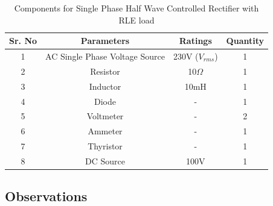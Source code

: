 \begin{table}[h]
    \renewcommand{\arraystretch}{1.3}
    \label{table_components_required_single-phase-half-wave-controlled-rectifier-with-RLE-load}
    \centering
    \begin{tabular}{|c|c|c|c|}
        \hline
        Sr. No & Parameters                     & Ratings            & Quantity \\
        \hline
        \hline
        1      & AC Single Phase Voltage Source & 230V ($ V_{rms} $) & 1        \\
        \hline
        2      & Resistor                       & 10$ \Omega $       & 1        \\
        \hline
        3      & Inductor                       & 10mH               & 1        \\
        \hline
        4      & Diode                          & -                  & 1        \\
        \hline
        5      & Voltmeter                      & -                  & 2        \\
        \hline
        6      & Ammeter                        & -                  & 1        \\
        \hline
        7      & Thyristor                      & -                  & 1        \\
        \hline
        8      & DC Source                      & 100V               & 1        \\
        \hline
    \end{tabular}
    \caption{Components for Single Phase Half Wave Controlled Rectifier with RLE load}

\end{table}

\pagebreak

\subsection{Observations}

